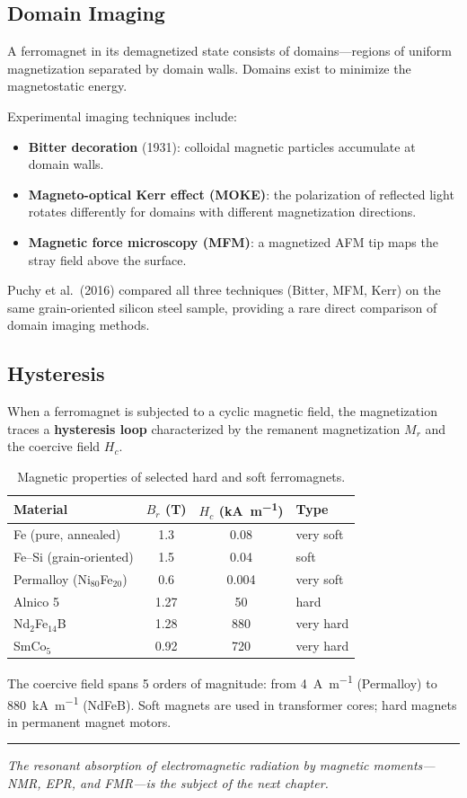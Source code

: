 \subsection{Domain Imaging}

A ferromagnet in its demagnetized state consists of domains---regions of uniform magnetization separated by domain walls. Domains exist to minimize the magnetostatic energy.

Experimental imaging techniques include:
\begin{itemize}[nosep]
  \item \textbf{Bitter decoration} (1931): colloidal magnetic particles accumulate at domain walls.
  \item \textbf{Magneto-optical Kerr effect (MOKE)}: the polarization of reflected light rotates differently for domains with different magnetization directions.
  \item \textbf{Magnetic force microscopy (MFM)}: a magnetized AFM tip maps the stray field above the surface.
\end{itemize}

Puchy et al.\ (2016) compared all three techniques (Bitter, MFM, Kerr) on the same grain-oriented silicon steel sample, providing a rare direct comparison of domain imaging methods.

\subsection{Hysteresis}

When a ferromagnet is subjected to a cyclic magnetic field, the magnetization traces a \textbf{hysteresis loop} characterized by the remanent magnetization $M_r$ and the coercive field $H_c$.

\begin{table}[H]
\centering
\caption{Magnetic properties of selected hard and soft ferromagnets.}
\label{tab:hysteresis}
\begin{tabular}{@{}lSSl@{}}
\toprule
Material & {$B_r$ (\si{\tesla})} & {$H_c$ (\si{\kilo\ampere\per\metre})} & Type \\
\midrule
Fe (pure, annealed)     & 1.3 & 0.08  & very soft \\
Fe--Si (grain-oriented) & 1.5 & 0.04  & soft \\
Permalloy (Ni$_{80}$Fe$_{20}$) & 0.6 & 0.004 & very soft \\
\midrule
Alnico 5         & 1.27 & 50   & hard \\
Nd$_2$Fe$_{14}$B & 1.28 & 880  & very hard \\
SmCo$_5$         & 0.92 & 720  & very hard \\
\bottomrule
\end{tabular}
\end{table}

The coercive field spans 5 orders of magnitude: from \SI{4}{\ampere\per\metre} (Permalloy) to \SI{880}{\kilo\ampere\per\metre} (NdFeB). Soft magnets are used in transformer cores; hard magnets in permanent magnet motors.

\vspace{1cm}
\noindent\rule{\textwidth}{0.4pt}
\textit{The resonant absorption of electromagnetic radiation by magnetic moments---NMR, EPR, and FMR---is the subject of the next chapter.}
